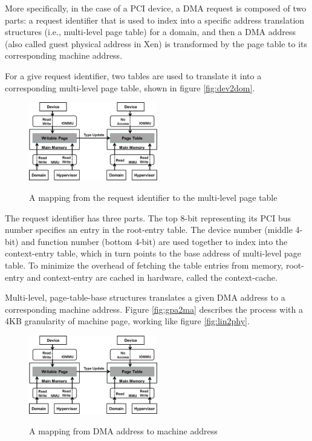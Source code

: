 More specifically, in the case of a PCI device, a DMA request is composed of two parts: a request identifier that is used to index into a specific address translation structures (i.e., multi-level page table) for a domain, and then a DMA address (also called guest physical address in Xen) is transformed by the page table to its corresponding machine address.

For a give request identifier, two tables are used to translate it into a corresponding multi-level page table, shown in figure \ref{fig:dev2dom}.

\begin{figure}[ht]
\centering
\includegraphics[width=0.5\textwidth]{image/background/dev2dom.png} \\
\caption{A mapping from the request identifier to the multi-level page table}
\label{fig: dev2dom}
\end{figure}

The request identifier has three parts. The top 8-bit representing its PCI bus number specifies an entry in the root-entry table. The device number (middle 4-bit) and function number (bottom 4-bit) are used together to index into the context-entry table, which in turn points to the base address of multi-level page table. To minimize the overhead of fetching the table entries from memory, root-entry and context-entry are cached in hardware, called the context-cache.

Multi-level, page-table-base structures translates a given DMA address to a corresponding machine address. Figure \ref{fig:gpa2ma} describes the process with a 4KB granularity of machine page, working like figure \ref{fig:lin2phy}.

\begin{figure}[ht]
\centering
\includegraphics[width=0.5\textwidth]{image/background/gpa2ma.png} \\
\caption{A mapping from DMA address to machine address}
\label{fig: gpa2ma}
\end{figure}

